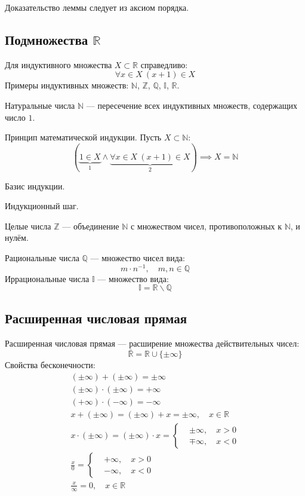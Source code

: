 Доказательство леммы следует из {\ital аксиом порядка}.

\subsection{Подмножества $\mathbb{R}$}

Для {\bold индуктивного} множества $X\subset\mathbb{R}$ справедливо:
$$\forall x\in X\ (x+1)\in X$$
Примеры индуктивных множеств: $\mathbb{N}$, $\mathbb{Z}$, $\mathbb{Q}$, $\mathbb{I}$, $\mathbb{R}$.

{\bold Натуральные числа} $\mathbb{N}$ --- пересечение всех индуктивных множеств, содержащих число $1$.

\begin{theorem}
{\bold Принцип математической индукции.} Пусть $X\subset\mathbb{N}$:
$$(\underbrace{1\in X}_{1}\land\underbrace{\forall x\in X\ (x+1)\in X}_{2})\implies X=\mathbb{N}$$
\begin{list*}[][\#]
\item Базис индукции.
\item Индукционный шаг.
\end{list*}
\end{theorem}
{\bold Целые числа} $\mathbb{Z}$ --- объединение $\mathbb{N}$ с множеством чисел, противоположных к $\mathbb{N}$, и нулём.

{\bold Рациональные числа} $\mathbb{Q}$ --- множество чисел вида:
$$m\cdot n^{-1},\quad m,n\in\mathbb{Q}$$
{\bold Иррациональные числа} $\mathbb{I}$ --- множество вида:
$$\mathbb{I}=\mathbb{R}\backslash\mathbb{Q}$$

\subsection{Расширенная числовая прямая}

{\bold Расширенная числовая прямая} --- расширение множества действительных 
чисел:
$$\bar{\mathbb{R}}=\mathbb{R}\cup\{\pm\infty\}$$
Свойства бесконечности:
$$\begin{gathered}
(\pm\infty)+(\pm\infty)=\pm\infty\\
(\pm\infty)\cdot(\pm\infty)=+\infty\\
(+\infty)\cdot(-\infty)=-\infty\\
x+(\pm\infty)=(\pm\infty)+x=\pm\infty,\quad x\in\mathbb{R}\\
x\cdot(\pm\infty)=(\pm\infty)\cdot x=\begin{cases*}
&\pm\infty,\quad x\greater 0\\
&\mp\infty,\quad x\less 0
\end{cases*}\\
\frac{x}{0}=\begin{cases*}
&+\infty,\quad x\greater 0\\
&-\infty,\quad x\less 0
\end{cases*}\\
\frac{x}{\infty}=0,\quad x\in\mathbb{R}
\end{gathered}$$


